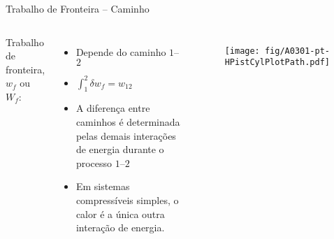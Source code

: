     \begin{frame}{Trabalho de Fronteira -- Caminho}\vspace*{-2em}
        \begin{columns}
        Trabalho de fronteira, $w_f$ ou $W_f$:
        \begin{itemize}
            \item<1-> Depende do \alert{caminho $1$--$2$} \\[\medskipamount]
            \item<2-> $\int_1^2\delta w_f = w_{12}\;$ \\[\medskipamount]
            \item<4-> A \alert{diferença} entre caminhos é determinada pelas demais interações
                de energia durante o processo $1$--$2$ \\[\medskipamount]
            \item<5-> Em \alert{sistemas compressíveis simples}, o \alert{calor} é a única outra
                interação de energia.
        \end{itemize}
            \begin{figure}
                \texttt{[image: fig/A0301-pt-HPistCylPlotPath.pdf]}
            \end{figure}
        \end{columns}
    \end{frame}

